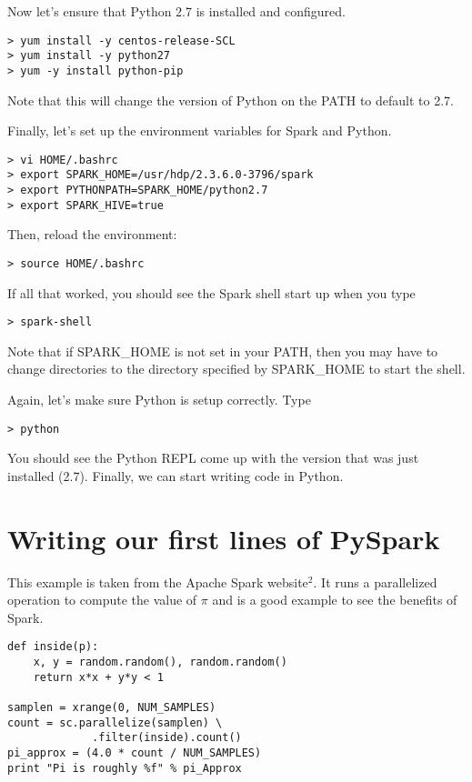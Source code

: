 \documentclass[9pt,twocolumn,twoside]{idsi}
\begin{document}
Now let's ensure that Python 2.7 is installed and configured.
\begin{verbatim}
> yum install -y centos-release-SCL
> yum install -y python27
> yum -y install python-pip
\end{verbatim}
Note that this will change the version of Python on the PATH to default to 2.7.

\noindent
Finally, let's set up the environment variables for Spark and Python.
\begin{verbatim}
> vi HOME/.bashrc
> export SPARK_HOME=/usr/hdp/2.3.6.0-3796/spark
> export PYTHONPATH=SPARK_HOME/python2.7
> export SPARK_HIVE=true
\end{verbatim}

\noindent
Then, reload the environment:
\begin{verbatim}
> source HOME/.bashrc
\end{verbatim}

If all that worked, you should see the Spark shell start up when you type
\begin{verbatim}
> spark-shell
\end{verbatim}

Note that if SPARK\_HOME is not set in your PATH, then you may have to change directories to the directory specified by SPARK\_HOME to start the shell.

Again, let's make sure Python is setup correctly. Type
\begin{verbatim}
> python
\end{verbatim}
You should see the Python REPL come up with the version that was just installed (2.7). Finally, we can start writing code in Python.

\section{Writing our first lines of PySpark}

This example is taken from the Apache Spark website$^2$. It runs a parallelized operation to compute the value of $\pi$ and is a good example to see the benefits of Spark.

\begin{mdframed}
\begin{verbatim}
def inside(p):
    x, y = random.random(), random.random()
    return x*x + y*y < 1

samplen = xrange(0, NUM_SAMPLES)
count = sc.parallelize(samplen) \
             .filter(inside).count()
pi_approx = (4.0 * count / NUM_SAMPLES)
print "Pi is roughly %f" % pi_Approx
\end{verbatim}
\end{mdframed}
\end{document}
